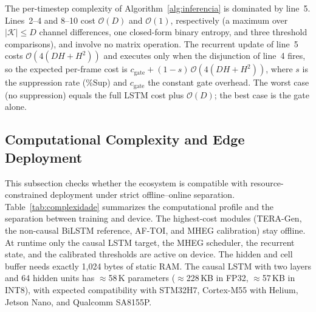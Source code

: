 \documentclass[a4paper,fleqn]{cas-dc}
\newcommand{\TERAGen}{\mbox{TERA-Gen}\xspace}
\newcommand{\AFTOI}{\mbox{AF-TOI}\xspace}
\newcommand{\MHEG}{\mbox{MHEG}\xspace}
\begin{document}
{\color{\revcolor}The per-timestep complexity of Algorithm~\ref{alg:inferencia} is
dominated by line~5. Lines~2--4 and 8--10 cost $\mathcal{O}(D)$ and
$\mathcal{O}(1)$, respectively (a maximum over $|\mathcal{K}| \le D$ channel
differences, one closed-form binary entropy, and three threshold comparisons),
and involve no matrix operation. The recurrent update of line~5 costs
$\mathcal{O}(4(DH{+}H^2))$ and executes only when the disjunction of line~4
fires, so the expected per-frame cost is
$c_{\mathrm{gate}} + (1-s)\,\mathcal{O}(4(DH{+}H^2))$, where $s$ is the
suppression rate (\%Sup) and $c_{\mathrm{gate}}$ the constant gate overhead.
The worst case (no suppression) equals the full LSTM cost plus
$\mathcal{O}(D)$; the best case is the gate alone.}
\subsection{Computational Complexity and Edge Deployment}
\label{sec:complexidade}
This subsection checks whether the ecosystem is compatible with resource-constrained deployment under strict offline--online separation.
Table~\ref{tab:complexidade} summarizes the computational profile and the
separation between training and device. The highest-cost modules (\TERAGen, the
non-causal BiLSTM reference, \AFTOI, and \MHEG calibration) stay offline. At
runtime only the causal LSTM target, the \MHEG scheduler, the recurrent state,
and the calibrated thresholds are active on device.
The hidden and cell buffer needs exactly 1,024 bytes of static RAM. The causal
LSTM with two layers and 64 hidden units has $\approx$58\,K parameters
($\approx$228\,KB in FP32, $\approx$57\,KB in INT8), with expected compatibility
with STM32H7, Cortex-M55 with Helium, Jetson Nano, and Qualcomm SA8155P.
\end{document}
